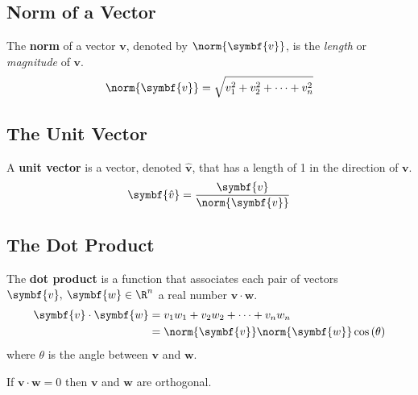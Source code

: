 \documentclass{article}
\begin{document}
\subsection{Norm of a Vector}
\begin{definition}
    The \textbf{norm} of a vector \(\symbf{v}\), denoted by
    \(\norm{\symbf{v}}\), is the \textit{length} or \textit{magnitude}
    of \(\symbf{v}\).
    \begin{equation*}
        \norm{\symbf{v}} = \sqrt{v_1^2 + v_2^2+\cdots+v_n^2}
    \end{equation*}
\end{definition}
\subsection{The Unit Vector}
\begin{definition}
    A \textbf{unit vector} is a vector, denoted \(\symbf{\hat{v}}\),
    that has a length of 1 in the direction of \(\symbf{v}\).
    \begin{equation*}
        \symbf{\hat{v}} = \frac{\symbf{v}}{\norm{\symbf{v}}}
    \end{equation*}
\end{definition}
\subsection{The Dot Product}
\begin{definition}
    The \textbf{dot product} is a function that associates each pair of
    vectors \(\symbf{v},\: \symbf{w} \in \R^n\) a real
    number \(\symbf{v}\cdot\symbf{w}\).
    \begin{align*}
        \symbf{v}\cdot\symbf{w} & = v_1 w_1 + v_2 w_2 + \cdots + v_n w_n                        \\
                                & = \norm{\symbf{v}} \norm{\symbf{w}} \cos{\left(\theta\right)}
    \end{align*}
    where \(\theta\) is the angle between \(\symbf{v}\) and
    \(\symbf{w}\).
\end{definition}
\begin{theorem}
    If \(\symbf{v} \cdot \symbf{w}=0\) then \(\symbf{v}\) and
    \(\symbf{w}\) are orthogonal.
\end{theorem}
\end{document}
